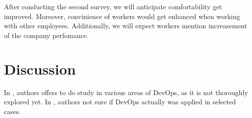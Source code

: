 \documentclass[oneside,final,12pt,a4paper]{extreport}
\begin{document}
After conducting the second survey, we will anticipate comfortability get improved. Moreover, convinience of workers would get enhanced when working with other employees. Additionally, we will expect workers mention increasement of the company perfomance.

\section{Discussion}
In \cite{11}, authors offers to do study in various areas of DevOps, as it is not thoroughly explored yet. In \cite{21}, authors not sure if DevOps actually was applied in selected cases.


\newpage
\printbibliography[heading=bibintoc,title={References}]
\end{document}
